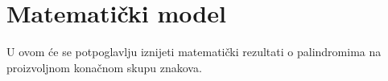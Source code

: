 \section{Matematički model}

U ovom će se potpoglavlju iznijeti matematički
rezultati o palindromima na proizvoljnom konačnom
skupu znakova.
